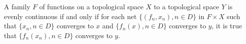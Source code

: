 A family $F$ of functions on a topological space $X$ to a topological space $Y$ is evenly continuous if and only if for each net $\{(f_n, x_n), n \in D\}$ in $F \times X$ such that $\{x_n, n \in D\}$ converges to $x$ and $\{f_n(x), n \in D\}$ converges to $y$, it is true that $\{f_n(x_n), n \in D\}$ converges to $y$.
